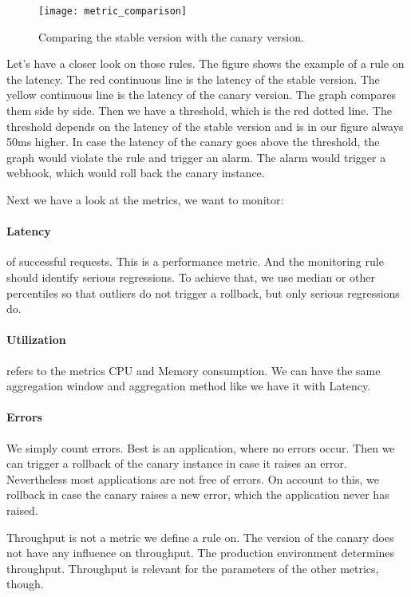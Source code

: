 \begin{figure}[htbp]
  \centering
  \texttt{[image: metric\_comparison]}
  \caption[metric_comparison]{Comparing the stable version with the canary version.}
  \label{fig:3tierwebapp}
\end{figure}

Let's have a closer look on those rules. The figure shows the example of a rule on the
latency. The red continuous line is the latency of the stable version. The yellow
continuous line is the latency of the canary version. The graph compares them side by
side. Then we have a threshold, which is the red dotted line. The threshold depends on the
latency of the stable version and is in our figure always 50ms higher. In case the latency
of the canary goes above the threshold, the graph would violate the rule and trigger an
alarm. The alarm would trigger a webhook, which would roll back the canary instance.

Next we have a look at the metrics, we want to monitor:

\paragraph{Latency} of successful requests. This is a performance metric. And the
monitoring rule should identify serious regressions. To achieve that, we use median or
other percentiles so that outliers do not trigger a rollback, but only serious
regressions do.

\paragraph{Utilization} refers to the metrics CPU and Memory consumption. We can have the
same aggregation window and aggregation method like we have it with Latency.

\paragraph{Errors} We simply count errors. Best is an application, where no errors
occur. Then we can trigger a rollback of the canary instance in case it raises an
error. Nevertheless most applications are not free of errors. On account to this, we
rollback in case the canary raises a new error, which the application never has raised.

Throughput is not a metric we define a rule on. The version of the canary does not have
any influence on throughput. The production environment determines throughput. Throughput
is relevant for the parameters of the other metrics, though.

